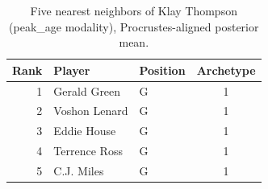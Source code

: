 \begin{table}[htbp]
  \centering\small
  \begin{tabular}{rllc}
    \toprule
    Rank & Player & Position & Archetype \\
    \midrule
    1 & Gerald Green & G & 1 \\
    2 & Voshon Lenard & G & 1 \\
    3 & Eddie House & G & 1 \\
    4 & Terrence Ross & G & 1 \\
    5 & C.J. Miles & G & 1 \\
    \bottomrule
  \end{tabular}
  \caption{Five nearest neighbors of Klay Thompson (peak_age modality), Procrustes-aligned posterior mean.}
  \label{tab:Klay_Thompson_neighbors_peak_age}
\end{table}


